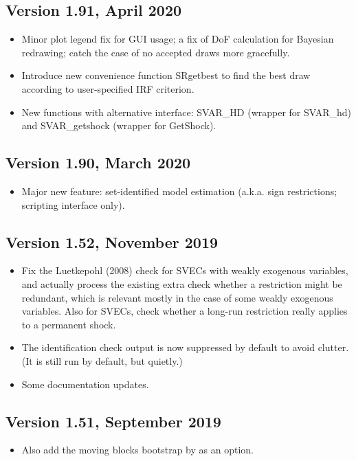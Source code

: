 \documentclass[a4paper,10pt]{article}
\newcounter{script}[section]
\begin{document}
\subsection*{Version 1.91, April 2020}
\begin{itemize}
\item Minor plot legend fix for GUI usage; a fix of DoF calculation for
Bayesian redrawing; catch the case of no accepted draws more gracefully.
\item Introduce new convenience function SRgetbest to find the best draw
according to user-specified IRF criterion.
\item New functions with alternative interface: SVAR\_HD (wrapper for SVAR\_hd)
and SVAR\_getshock (wrapper for GetShock).
\end{itemize}

\subsection*{Version 1.90, March 2020}
\begin{itemize}
\item Major new feature: set-identified model estimation (a.k.a. sign restrictions;
scripting interface only). 
 
\end{itemize}

\subsection*{Version 1.52, November 2019}
\begin{itemize}
\item Fix the Luetkepohl (2008) check for SVECs with weakly exogenous variables,
and actually process the existing extra check whether a restriction might be redundant,
which is relevant mostly in the case of some weakly exogenous variables.
Also for SVECs, check whether a long-run restriction really applies to a permanent shock.

\item The identification check output is now suppressed by default to avoid clutter.
(It is still run by default, but quietly.)

\item Some documentation updates.

\end{itemize}


\subsection*{Version 1.51, September 2019}
\begin{itemize}
\item Also add the moving blocks bootstrap by \cite{BrugJenTrenk16} as an option.
\end{itemize}
\end{document}
